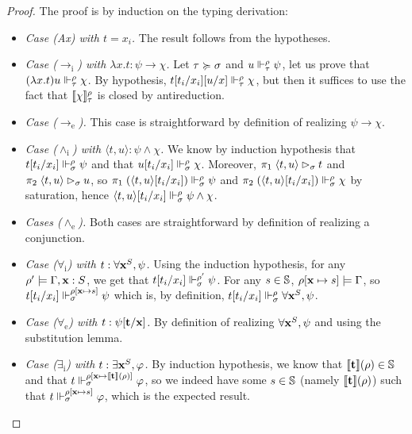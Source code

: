 \documentclass[a4paper,UKenglish,cleveref, autoref, thm-restate]{lipics-v2021}
\begin{document}
\begin{proof}

 The proof is by induction on the typing derivation:
 \newcommand{\case}[2]{\emph{Case \emph{(#1)} with #2.}}
 \newcommand{\Case}[1]{\emph{Case \emph{(#1)}.}}
 \newcommand{\Cases}[1]{\emph{Cases \emph{(#1)}.}}
  \begin{itemize}
  \item \case{Ax}{$t = x_i$} The result follows from the hypotheses.
  \item \case{$\to_\mathrm i$}{$\lambda x.t : \psi \to \chi$}
  Let $\tau \succcurlyeq\sigma$ and $u \Vdash_{\tau}^{\rho} \psi$, let us prove that $(\lambda x.t)u \Vdash_{\tau}^{\rho} \chi$. By hypothesis, $t[t_i/x_i][u/x] \Vdash_{\tau}^{\rho} \chi$, but then it suffices to use the fact that $\llbracket \chi \rrbracket^{\rho}_{\tau}$ is closed by antireduction.
  \item \Case{$\to_\mathrm e$} This case is straightforward by definition of realizing $\psi \to \chi$.
  \item \case{$\land_\mathrm i$}{$\langle t,u \rangle : \psi \land \chi$}
  We know by induction hypothesis that $t[t_i/x_i] \Vdash_{\sigma}^{\rho} \psi$ and that $u[t_i/x_i] \Vdash_{\sigma}^{\rho} \chi$. Moreover, $\pi_1\; \langle t,u \rangle \rhd_{\sigma} t$ and $\pi_2\;\langle t,u \rangle \rhd_{\sigma} u$, so $\pi_1\;(\langle t,u\rangle[t_i/x_i]) \Vdash_{\sigma}^{\rho}\psi$ and $\pi_2\;(\langle t,u\rangle[t_i/x_i]) \Vdash_{\sigma}^{\rho} \chi$ by saturation, hence $\langle t,u\rangle [t_i/x_i] \Vdash_{\sigma}^{\rho} \psi\land \chi$.
  \item \Cases{$\land_\mathrm e$}
  Both cases are straightforward by definition of realizing a conjunction.
  \item \case{$\forall_\mathrm i$}{$t : \forall \mathbf{x}^S, \psi$}
  Using the induction hypothesis, for any $\rho' \models \Gamma, \mathbf{x} : S$,  we get that $t[t_i/x_i] \Vdash_{\sigma}^{\rho'} \psi$. For any $s \in \mathbb S$, $\rho[\mathbf{x} \mapsto s] \models \Gamma$, so $t[t_i/x_i] \Vdash_{\sigma}^{\rho[\mathbf{x}\mapsto s]} \psi$ which is, by definition, $t[t_i/x_i] \Vdash_{\sigma}^{\rho} \forall \mathbf{x}^S,\psi$.
  \item \case{$\forall_\mathrm e$}{$t : \psi[\mathbf{t}/\mathbf{x}]$}
  By definition of realizing $\forall \mathbf{x}^S, \psi$ and using the substitution lemma.
  \item \case{$\exists_\mathrm i$}{$t : \exists \mathbf{x}^S, \varphi$}
  By induction hypothesis, we know that $\llbracket \mathbf{t} \rrbracket(\rho) \in \mathbb S$ and that $t \Vdash_{\sigma}^{\rho[\mathbf{x} \mapsto \llbracket \mathbf{t} \rrbracket(\rho)]} \varphi$, so we indeed have some $s \in \mathbb S$ (namely $\llbracket \mathbf{t} \rrbracket(\rho)$) such that $t \Vdash_{\sigma}^{\rho[\mathbf{x}\mapsto s]}\varphi$, which is the expected result.

\end{itemize}
\end{proof}
\end{document}
